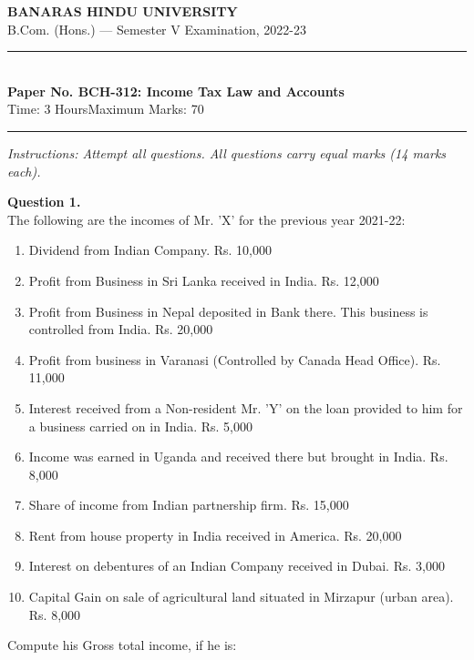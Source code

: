 \documentclass[11pt,a4paper]{article}
\begin{document}
\begin{center}
  {\large\bfseries BANARAS HINDU UNIVERSITY}\\[2pt]
  {\normalsize B.Com. (Hons.) --- Semester V Examination, 2022-23}\\[6pt]
  \rule{0.8\linewidth}{0.5pt}\\[6pt]
  {\large\bfseries Paper No. BCH-312: Income Tax Law and Accounts}\\[4pt]
  {\normalsize Time: 3 Hours\hfill Maximum Marks: 70}
\end{center}

\rule{\linewidth}{0.4pt}

\smallskip



\noindent   \textit{Instructions: Attempt all questions. All questions carry equal marks (14 marks each).}

\bigskip




\noindent   \textbf{Question 1.} \\
The following are the incomes of Mr. 'X' for the previous year 2021-22:

\begin{enumerate}[label=(\arabic*),leftmargin=*]
  \item Dividend from Indian Company. \hfill Rs. 10,000
  \item Profit from Business in Sri Lanka received in India. \hfill Rs. 12,000
  \item Profit from Business in Nepal deposited in Bank there. This business is controlled from India. \hfill Rs. 20,000
  \item Profit from business in Varanasi (Controlled by Canada Head Office). \hfill Rs. 11,000
  \item Interest received from a Non-resident Mr. 'Y' on the loan provided to him for a business carried on in India. \hfill Rs. 5,000
  \item Income was earned in Uganda and received there but brought in India. \hfill Rs. 8,000
  \item Share of income from Indian partnership firm. \hfill Rs. 15,000
  \item Rent from house property in India received in America. \hfill Rs. 20,000
  \item Interest on debentures of an Indian Company received in Dubai. \hfill Rs. 3,000
  \item Capital Gain on sale of agricultural land situated in Mirzapur (urban area). \hfill Rs. 8,000
\end{enumerate}
Compute his Gross total income, if he is:
\end{document}
